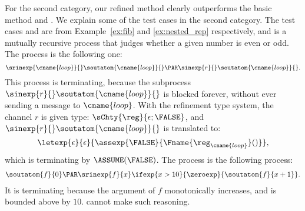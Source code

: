 For the second category, our refined method clearly outperforms the basic method
and \typical{}.
We explain some of the test cases in the second category.
The test cases  and  are from Example~\ref{ex:fib}
and \ref{ex:nested_rep} respectively, and  is a mutually recursive process
that judges whether a given number is even or odd.
The process  is the following one:
\[    \srinexp{\cname{loop}}{} \soutatom{\cname{loop}}{} 
    \PAR \sinexp{r}{} \soutatom{\cname{loop}}{}. \]
    This process is terminating, because the subprocess
    \(\sinexp{r}{} \soutatom{\cname{loop}}{}\) is blocked forever, without ever sending
    a message to \(\cname{loop}\).
    With the refinement type system, the channel \(r\) is given type:
    \(\sChty{\reg}{\epsilon;\FALSE}\), and
    \(\sinexp{r}{} \soutatom{\cname{loop}}{}\) is translated to:
    \[
\letexp{\epsilon}{\epsilon}{\assexp{\FALSE}{\Fname{\reg_{\cname{loop}}}()}},
    \]
    which is terminating by $\ASSUME(\FALSE)$.
    The process  is the following process:
    \begin{align*}
    \soutatom{f}{0} \PAR \srinexp{f}{x} \ifexp{x>10}{\zeroexp}{\soutatom{f}{x+1}}.
\end{align*}
    It is terminating because the argument of \(f\) monotonically increases, and is bounded
    above by \(10\). \typical{} cannot make such reasoning.


